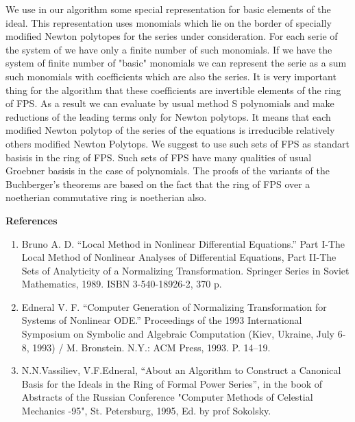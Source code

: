 We use in our algorithm some special representation for basic elements of the ideal. This
representation uses monomials which lie on the border of specially modified Newton polytopes for
the series under consideration. For each serie of the system of we have only a finite number of such
monomials. If we have the system of finite number of "basic" monomials we can represent the
serie as a sum such monomials with coefficients which are also the series. It is very important
thing for the algorithm that these coefficients are invertible elements of the ring of FPS. As a
result we can evaluate by usual method S polynomials and make reductions of the leading terms
only for Newton polytops. It means that each modified Newton polytop of the series of the
equations is irreducible relatively others modified Newton Polytops. We suggest to use such sets
of FPS as standart basisis in the ring of FPS. Such sets of FPS have many qualities of usual
Groebner basisis in the case of polynomials. The proofs of the variants of the Buchberger's
theorems are based on the fact that the ring of FPS over a noetherian commutative ring is
noetherian also. 

\bigskip
\noindent 
{\bf References}
\begin{enumerate}

\item
 Bruno A. D. ``Local Method in Nonlinear Differential Equations.'' Part I-The Local Method of
Nonlinear Analyses of Differential Equations, Part II-The Sets of Analyticity of a Normalizing
Transformation. Springer Series in Soviet Mathematics, 1989. ISBN 3-540-18926-2, 370 p. 


\item
Edneral V. F. ``Computer Generation of Normalizing Transformation for Systems of Nonlinear
ODE.'' Proceedings of the 1993 International Symposium on Symbolic and Algebraic
Computation (Kiev, Ukraine, July 6-8, 1993) / M. Bronstein. N.Y.: ACM Press, 1993. P. 14--19. 


\item
 N.N.Vassiliev, V.F.Edneral, ``About an Algorithm to Construct a Canonical Basis for the Ideals
in the Ring of Formal Power Series'', in the book of Abstracts of the Russian Conference
"Computer Methods of Celestial Mechanics -95", St. Petersburg, 1995, Ed. by prof Sokolsky. 


\end{enumerate}